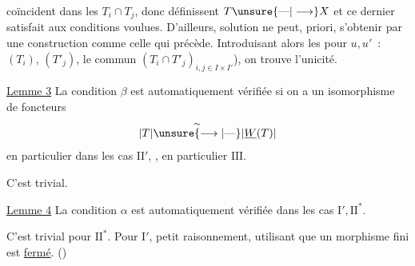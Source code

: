 coïncident dans les $T_i\cap T_j$, donc définissent $T\unsure{\text{---}|\longrightarrow}X$ et ce dernier satisfait aux conditions voulues. D'ailleurs,   solution ne peut,  priori, s'obtenir par une construction comme celle qui précède. Introduisant alors les
pour $u,u'$ \,: $(T_i)$, $(T'_j)$, le  commun $(T_i\cap T'_j)_{i,j\in I\times I'}$), on trouve l'unicité.

\uline{Lemme 3} La condition $\beta$ est automatiquement vérifiée  si on a un isomorphisme de foncteurs
\[
|T|\overset{\sim}{\unsure{\longrightarrow|\text{---}}}|\underline W(T)|
\]
en particulier dans les cas $\mathrm{II}'$, , en particulier $\mathrm{III}$.

C'est trivial.

\uline{Lemme 4} La condition $\alpha$ est automatiquement vérifiée dans les cas $\mathrm{I}',\mathrm{II}^{*}$.

C'est trivial pour $\mathrm{II}^{*}$. Pour $\mathrm{I}'$, petit raisonnement, utilisant que un morphisme fini est \uline{fermé}. ()
